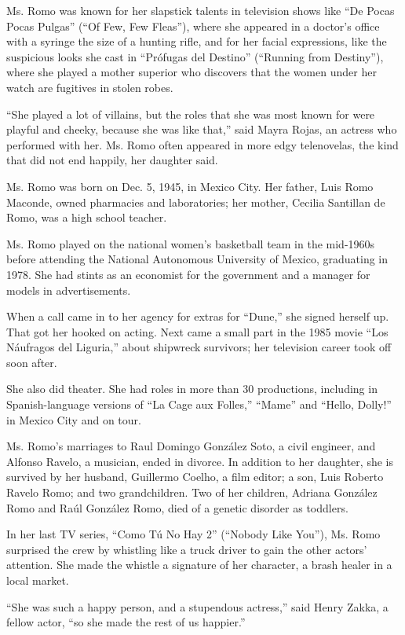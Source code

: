 Ms. Romo was known for her slapstick talents in television shows like
``De Pocas Pocas Pulgas'' (``Of Few, Few Fleas''), where she appeared in
a doctor's office with a syringe the size of a hunting rifle, and for
her facial expressions, like the suspicious looks she cast in ``Prófugas
del Destino'' (``Running from Destiny''), where she played a mother
superior who discovers that the women under her watch are fugitives in
stolen robes.

``She played a lot of villains, but the roles that she was most known
for were playful and cheeky, because she was like that,'' said Mayra
Rojas, an actress who performed with her. Ms. Romo often appeared in
more edgy telenovelas, the kind that did not end happily, her daughter
said.

Ms. Romo was born on Dec. 5, 1945, in Mexico City. Her father, Luis Romo
Maconde, owned pharmacies and laboratories; her mother, Cecilia
Santillan de Romo, was a high school teacher.

Ms. Romo played on the national women's basketball team in the mid-1960s
before attending the National Autonomous University of Mexico,
graduating in 1978. She had stints as an economist for the government
and a manager for models in advertisements.

When a call came in to her agency for extras for ``Dune,'' she signed
herself up. That got her hooked on acting. Next came a small part in the
1985 movie ``Los Náufragos del Liguria,'' about shipwreck survivors; her
television career took off soon after.

She also did theater. She had roles in more than 30 productions,
including in Spanish-language versions of ``La Cage aux Folles,''
``Mame'' and ``Hello, Dolly!'' in Mexico City and on tour.

Ms. Romo's marriages to Raul Domingo González Soto, a civil engineer,
and Alfonso Ravelo, a musician, ended in divorce. In addition to her
daughter, she is survived by her husband, Guillermo Coelho, a film
editor; a son, Luis Roberto Ravelo Romo; and two grandchildren. Two of
her children, Adriana González Romo and Raúl González Romo, died of a
genetic disorder as toddlers.

In her last TV series, ``Como Tú No Hay 2'' (``Nobody Like You''), Ms.
Romo surprised the crew by whistling like a truck driver to gain the
other actors' attention. She made the whistle a signature of her
character, a brash healer in a local market.

``She was such a happy person, and a stupendous actress,'' said Henry
Zakka, a fellow actor, ``so she made the rest of us happier.''

